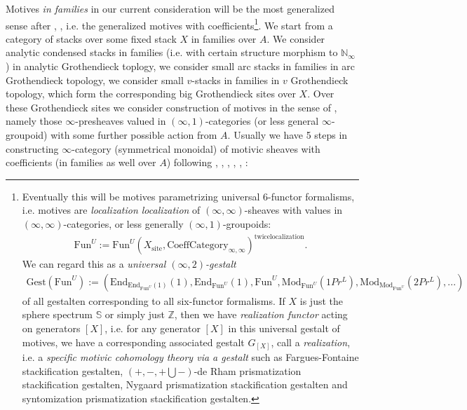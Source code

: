 \documentclass[12pt]{article}
\theoremstyle{definition}
\begin{document}
Motives \textit{in families} in our current consideration will be the most generalized sense after \cite{3S}, \cite{3A}, i.e. the generalized motives with coefficients\footnote{Eventually this will be motives parametrizing universal 6-functor formalisms, i.e. motives are \textit{localization localization} of $(\infty,\infty)$-sheaves with values in $(\infty,\infty)$-categories, or less generally $(\infty,1)$-groupoids:
\begin{align}
\mathrm{Fun}^U:=\mathrm{Fun}^U(X_{\mathrm{site}}, \mathrm{CoeffCategory}_{\infty,\infty})^{\mathrm{twicelocalization}}.
\end{align}
We can regard this as a \textit{universal $(\infty,2)$-gestalt}
\begin{align}
\mathrm{Gest}(\mathrm{Fun}^U):= (\mathrm{End}_{\mathrm{End}_{\mathrm{Fun}^U}(1)}(1),\mathrm{End}_{\mathrm{Fun}^U}(1),\mathrm{Fun}^U,\mathrm{Mod}_{\mathrm{Fun}^U}(1Pr^L),\mathrm{Mod}_{\mathrm{Mod}_{\mathrm{Fun}^U}}(2Pr^L),...)
\end{align}
of all gestalten corresponding to all six-functor formalisms. If $X$ is just the sphere spectrum $\mathbb{S}$ or simply just $\mathbb{Z}$, then we have \textit{realization functor} acting on generators $[X]$, i.e. for any generator $[X]$ in this universal gestalt of motives, we have a corresponding associated gestalt $G_{[X]}$, call a \textit{realization}, i.e. a \textit{specific motivic cohomology theory via a gestalt} such as Fargues-Fontaine stackification gestalten, $(+,-, + \bigcup -)$-de Rham prismatization stackification gestalten, Nygaard prismatization stackification gestalten and syntomization prismatization stackification gestalten.}. We start from a category of stacks over some fixed stack $X$ in families over $A$. We consider analytic condensed stacks in families (i.e. with certain structure morphism to $\mathbb{N}_\infty$) in analytic Grothendieck toplogy, we consider small arc stacks in families in arc Grothendieck topology, we consider small $v$-stacks in families in $v$ Grothendieck topology, which form the corresponding big Grothendieck sites over $X$. Over these Grothendieck sites we consider construction of motives in the sense of \cite{3S}, \cite{3A} namely those $\infty$-presheaves valued in $(\infty,1)$-categories (or less general $\infty$-groupoid) with some further possible action from $A$. Usually we have 5 steps in constructing $\infty$-category (symmetrical monoidal) of motivic sheaves with coefficients (in families as well over $A$) following \cite{3G}, \cite{3V}, \cite{3A}, \cite{3S}, \cite{5S4}, \cite{5S5}:
\end{document}
